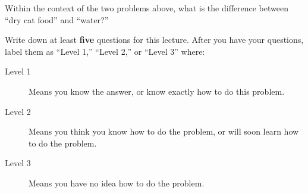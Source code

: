 \documentclass{ximera}
\begin{document}
\begin{problem}
  Within the context of the two problems above, what is the difference
  between ``dry cat food'' and ``water?''
  \begin{freeResponse}
  \end{freeResponse}
\end{problem}



\begin{xarmaBoost}
  Write down at least \textbf{five} questions for this lecture. After
  you have your questions, label them as ``Level 1,'' ``Level 2,'' or
  ``Level 3'' where:
\begin{description}
\item[Level 1] Means you know the answer, or know exactly how to do
  this problem.
\item[Level 2] Means you think you know how to do the problem, or will
  soon learn how to do the problem.
\item[Level 3] Means you have no idea how to do the problem.
\end{description}
\begin{freeResponse}
\end{freeResponse}
\end{xarmaBoost}
\end{document}
